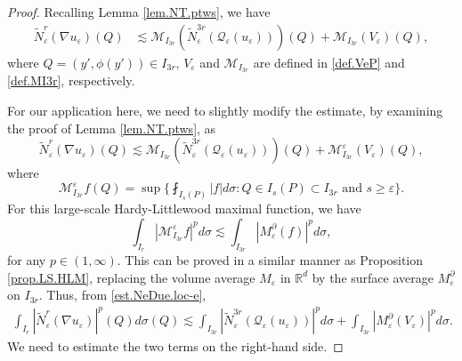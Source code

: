 \documentclass[reqno,12pt]{amsart} %
\theoremstyle{definition}
\theoremstyle{remark}
\numberwithin{equation}{section}
\newcommand{\M}{\mathcal{M}}
\newcommand{\Q}{\mathcal{Q}}
\newcommand{\R}{\mathbb{R}}
\newcommand{\e}{\varepsilon}
\begin{document}
\begin{proof}
Recalling Lemma \ref{lem.NT.ptws}, we have
\begin{equation}
    \begin{aligned}
        \widetilde{N}_\e^r(\nabla u_\e)(Q) &\lesssim \M_{I_{3r}} (\widetilde{N}_\e^{3r}(\Q_\e(u_\e)))(Q)  + \M_{I_{3r}} (V_\e)(Q),
    \end{aligned}    
\end{equation}
where $Q = (y',\phi(y')) \in I_{3r}$, $V_\e$ and $\M_{I_{3r}}$ are defined in \eqref{def.VeP} and \eqref{def.MI3r}, respectively.

For our application here, we need to slightly modify the estimate, by examining the proof of Lemma \ref{lem.NT.ptws}, as
\begin{equation}\label{est.NeDue.loc-e}
    \widetilde{N}_\e^r(\nabla u_\e)(Q) \lesssim \M_{I_{3r}} (\widetilde{N}_\e^{3r}(\Q_\e(u_\e)))(Q)  + \M_{I_{3r}}^\e (V_\e)(Q),
\end{equation}
where
\begin{equation}
    \M_{I_{3r}}^\e f(Q) = \sup \bigg\{ \fint_{I_s(P)} |f| d\sigma: Q\in I_s(P) \subset I_{3r} \text{ and } s \ge \e \bigg\}.
\end{equation}
For this large-scale Hardy-Littlewood maximal function, we have
\begin{equation}
    \int_{I_r} |\M_{I_{3r}}^\e f|^p d\sigma \lesssim \int_{I_{3r}} |M_\e^\partial (f)|^p d\sigma,
\end{equation}
for any $p\in (1,\infty)$. This can be proved in a similar manner as Proposition \ref{prop.LS.HLM}, replacing the volume average $M_\e$ in $\R^d$ by the surface average $M_\e^\partial$ on $I_{3r}$.
Thus, from \eqref{est.NeDue.loc-e},
\begin{equation}\label{est.local-Rp-Ir}
\begin{aligned}
    \int_{I_r} |\widetilde{N}_\e^r(\nabla u_\e)|^p(Q) d\sigma(Q) \lesssim \int_{I_{3r}} |\widetilde{N}_\e^{3r} (\Q_\e(u_\e)) |^p d\sigma + \int_{I_{3r}} |M_\e^\partial (V_\e)|^p d\sigma .
\end{aligned}
\end{equation}
We need to estimate the two terms on the right-hand side.


\end{proof}
\end{document}
